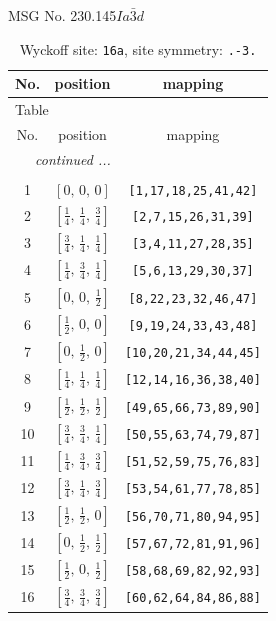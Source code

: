 \documentclass[fleqn,8pt]{jsarticle}
\begin{document}
\setcounter{MaxMatrixCols}{32}

\renewcommand{\tablename}{Table~}
\renewcommand{\figurename}{Figure~}
\begin{center}
\LARGE
MSG No. 230.145\quad$Ia\bar{3}d$
\end{center}
\renewcommand{\arraystretch}{1.2}
\begin{longtable}{ccc}
\caption{Wyckoff site: {\tt 16a}, site symmetry: {\tt .-3.}}
 \\
 \hline \hline
No. & position & mapping \\ \hline \endfirsthead

\multicolumn{2}{l}{\tablename\ \thetable{}} \\
 \hline \hline
No. & position & mapping \\ \hline \endhead

 \hline \hline
\multicolumn{2}{r}{\footnotesize\it continued ...} \\ \endfoot

 \hline \hline
\multicolumn{2}{r}{} \\ \endlastfoot

1 & $\left[ 0,\, 0,\, 0 \right]$ & {\tt [1,17,18,25,41,42]} \\ \hline
2 & $\left[ \frac{1}{4},\, \frac{1}{4},\, \frac{3}{4} \right]$ & {\tt [2,7,15,26,31,39]} \\ \hline
3 & $\left[ \frac{3}{4},\, \frac{1}{4},\, \frac{1}{4} \right]$ & {\tt [3,4,11,27,28,35]} \\ \hline
4 & $\left[ \frac{1}{4},\, \frac{3}{4},\, \frac{1}{4} \right]$ & {\tt [5,6,13,29,30,37]} \\ \hline
5 & $\left[ 0,\, 0,\, \frac{1}{2} \right]$ & {\tt [8,22,23,32,46,47]} \\ \hline
6 & $\left[ \frac{1}{2},\, 0,\, 0 \right]$ & {\tt [9,19,24,33,43,48]} \\ \hline
7 & $\left[ 0,\, \frac{1}{2},\, 0 \right]$ & {\tt [10,20,21,34,44,45]} \\ \hline
8 & $\left[ \frac{1}{4},\, \frac{1}{4},\, \frac{1}{4} \right]$ & {\tt [12,14,16,36,38,40]} \\ \hline
9 & $\left[ \frac{1}{2},\, \frac{1}{2},\, \frac{1}{2} \right]$ & {\tt [49,65,66,73,89,90]} \\ \hline
10 & $\left[ \frac{3}{4},\, \frac{3}{4},\, \frac{1}{4} \right]$ & {\tt [50,55,63,74,79,87]} \\ \hline
11 & $\left[ \frac{1}{4},\, \frac{3}{4},\, \frac{3}{4} \right]$ & {\tt [51,52,59,75,76,83]} \\ \hline
12 & $\left[ \frac{3}{4},\, \frac{1}{4},\, \frac{3}{4} \right]$ & {\tt [53,54,61,77,78,85]} \\ \hline
13 & $\left[ \frac{1}{2},\, \frac{1}{2},\, 0 \right]$ & {\tt [56,70,71,80,94,95]} \\ \hline
14 & $\left[ 0,\, \frac{1}{2},\, \frac{1}{2} \right]$ & {\tt [57,67,72,81,91,96]} \\ \hline
15 & $\left[ \frac{1}{2},\, 0,\, \frac{1}{2} \right]$ & {\tt [58,68,69,82,92,93]} \\ \hline
16 & $\left[ \frac{3}{4},\, \frac{3}{4},\, \frac{3}{4} \right]$ & {\tt [60,62,64,84,86,88]} \\
\end{longtable}
\end{document}
